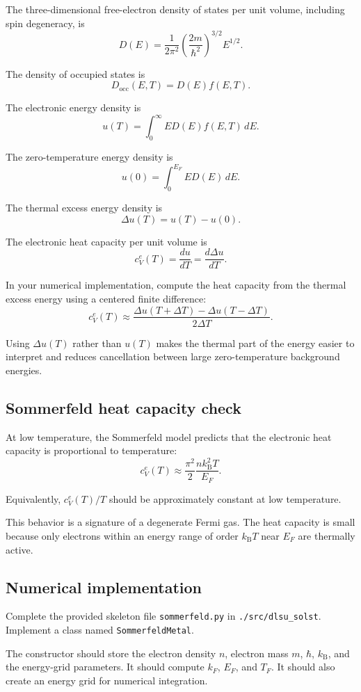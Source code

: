 The three-dimensional free-electron density of states per unit volume, including spin degeneracy, is
\[
D(E)
=
\frac{1}{2\pi^2}
\left(
\frac{2m}{\hbar^2}
\right)^{3/2}
E^{1/2}.
\]

The density of occupied states is
\[
D_{\mathrm{occ}}(E,T)=D(E)f(E,T).
\]

The electronic energy density is
\[
u(T)
=
\int_0^\infty
E D(E) f(E,T)\,dE.
\]

The zero-temperature energy density is
\[
u(0)
=
\int_0^{E_F}
E D(E)\,dE.
\]

The thermal excess energy density is
\[
\Delta u(T)=u(T)-u(0).
\]

The electronic heat capacity per unit volume is
\[
c_V^{e}(T)
=
\frac{d u}{dT}
=
\frac{d\Delta u}{dT}.
\]

In your numerical implementation, compute the heat capacity from the thermal excess energy using a centered finite difference:
\[
c_V^{e}(T)
\approx
\frac{\Delta u(T+\Delta T)-\Delta u(T-\Delta T)}{2\Delta T}.
\]

Using \(\Delta u(T)\) rather than \(u(T)\) makes the thermal part of the energy easier to interpret and reduces cancellation between large zero-temperature background energies.

\subsection{Sommerfeld heat capacity check}

At low temperature, the Sommerfeld model predicts that the electronic heat capacity is proportional to temperature:
\[
c_V^{e}(T)
\approx
\frac{\pi^2}{2}
\frac{nk_{\mathrm B}^2T}{E_F}.
\]

Equivalently, \(c_V^{e}(T)/T\) should be approximately constant at low temperature.

This behavior is a signature of a degenerate Fermi gas. The heat capacity is small because only electrons within an energy range of order \(k_{\mathrm B}T\) near \(E_F\) are thermally active.

\subsection{Numerical implementation}

Complete the provided skeleton file \texttt{sommerfeld.py} in \texttt{./src/dlsu\_solst}. Implement a class named \texttt{SommerfeldMetal}.

The constructor should store the electron density \(n\), electron mass \(m\), \(\hbar\), \(k_{\mathrm B}\), and the energy-grid parameters. It should compute \(k_F\), \(E_F\), and \(T_F\). It should also create an energy grid for numerical integration.

